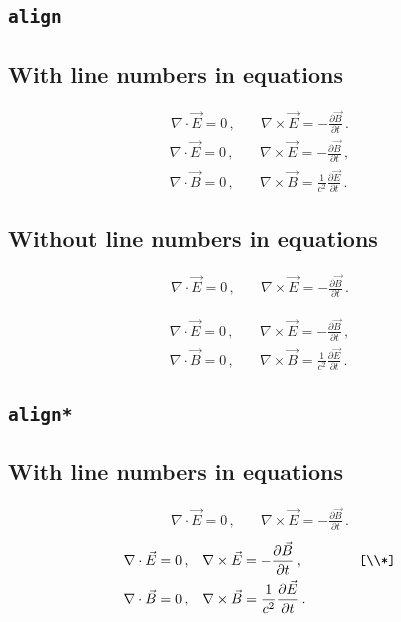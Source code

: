 \documentclass{ltxdoc}
\begin{document}
\subsection*{\texttt{align}}

\subsection*{With line numbers in equations}
\nextlipsum
\begin{align}
  \nabla \cdot \vec E = 0 \,, &\quad \nabla \times \vec E = - \frac{\partial \vec B}{\partial t} \,.
\end{align}
\nextlipsum
\begin{align}
  \nabla \cdot \vec E = 0 \,, &\quad \nabla \times \vec E = - \frac{\partial \vec B}{\partial t} \,, \\
  \nabla \cdot \vec B = 0 \,, &\quad \nabla \times \vec B = \frac{1}{c^2} \frac{\partial \vec E}{\partial t} \,.
\end{align}
\nextlipsum

\subsection*{Without line numbers in equations}
\nextlipsum
\begin{linenomath*}
\begin{align}
  \nabla \cdot \vec E = 0 \,, &\quad \nabla \times \vec E = - \frac{\partial \vec B}{\partial t} \,.
\end{align}
\end{linenomath*}
\nextlipsum
\begin{linenomath*}
\begin{align}
  \nabla \cdot \vec E = 0 \,, &\quad \nabla \times \vec E = - \frac{\partial \vec B}{\partial t} \,, \\
  \nabla \cdot \vec B = 0 \,, &\quad \nabla \times \vec B = \frac{1}{c^2} \frac{\partial \vec E}{\partial t} \,.
\end{align}
\end{linenomath*}
\nextlipsum

\subsection*{\texttt{align*}}

\subsection*{With line numbers in equations}
\nextlipsum
\begin{align*}
  \nabla \cdot \vec E = 0 \,, &\quad \nabla \times \vec E = - \frac{\partial \vec B}{\partial t} \,.
\end{align*}
\nextlipsum
\begin{align*}
  \nabla \cdot \vec E = 0 \,, &\quad \nabla \times \vec E = - \frac{\partial \vec B}{\partial t} \,, \qquad\qquad\texttt{[\textbackslash\textbackslash{}*]}\\*
  \nabla \cdot \vec B = 0 \,, &\quad \nabla \times \vec B = \frac{1}{c^2} \frac{\partial \vec E}{\partial t} \,.
\end{align*}
\nextlipsum
\end{document}
